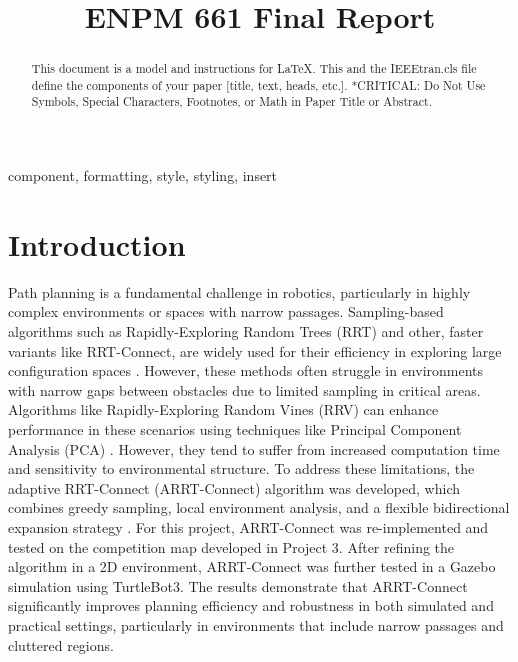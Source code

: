 \documentclass[conference]{IEEEtran}
\begin{document}
\title{ENPM 661 Final Report\\}

\author{
\and
{}
\and
{}
}

\maketitle

\begin{abstract}
This document is a model and instructions for \LaTeX.
This and the IEEEtran.cls file define the components of your paper [title, text, heads, etc.]. *CRITICAL: Do Not Use Symbols, Special Characters, Footnotes, 
or Math in Paper Title or Abstract.
\end{abstract}

\begin{IEEEkeywords}
component, formatting, style, styling, insert
\end{IEEEkeywords}

\section{Introduction}
Path planning is a fundamental challenge in robotics, particularly in highly complex environments or spaces with narrow passages. Sampling-based algorithms such as Rapidly-Exploring Random Trees (RRT) and other, faster variants like RRT-Connect, are widely used for their efficiency in exploring large configuration spaces \cite{b1, b2}. However, these methods often struggle in environments with narrow gaps between obstacles due to limited sampling in critical areas. Algorithms like Rapidly-Exploring Random Vines (RRV) can enhance performance in these scenarios using techniques like Principal Component Analysis (PCA) \cite{b3}. However, they tend to suffer from increased computation time and sensitivity to environmental structure. To address these limitations, the adaptive RRT-Connect (ARRT-Connect) algorithm was developed, which combines greedy sampling, local environment analysis, and a flexible bidirectional expansion strategy \cite{b4}. For this project, ARRT-Connect was re-implemented and tested on the competition map developed in Project 3. After refining the algorithm in a 2D environment, ARRT-Connect was further tested in a Gazebo simulation using TurtleBot3. The results demonstrate that ARRT-Connect significantly improves planning efficiency and robustness in both simulated and practical settings, particularly in environments that include narrow passages and cluttered regions.
\end{document}
